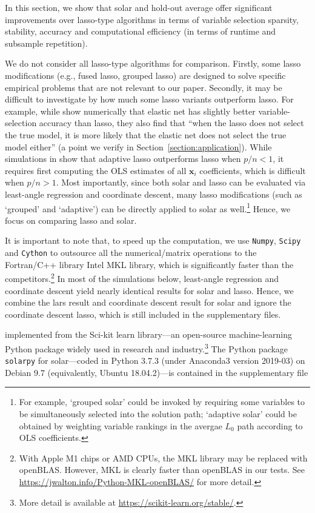 \documentclass[12pt]{article}
\begin{document}
In this section, we show that solar and hold-out average offer significant improvements over lasso-type algorithms in terms of variable selection sparsity, stability, accuracy and computational efficiency (in terms of runtime and subsample repetition).

We do not consider all lasso-type algorithms for comparison. Firstly, some lasso modifications (e.g., fused lasso, grouped lasso) are designed to solve specific empirical problems that are not relevant to our paper. Secondly, it may be difficult to investigate by how much some lasso variants outperform lasso. For example, while \citet{jia2010model} show numerically that elastic net has slightly better variable-selection accuracy than lasso, they also find that ``when the lasso does not select the true model, it is more likely that the elastic net does not select the true model either'' (a point we verify in Section~\ref{section:application}). While simulations in \citet{zou2006adaptive} show that adaptive lasso outperforms lasso when $p/n<1$, it requires first computing the OLS estimates of all $\mathbf{x}_i$ coefficients, which is difficult when $p/n>1$. Most importantly, since both solar and lasso can be evaluated via least-angle regression and coordinate descent, many lasso modifications (such as `grouped' and `adaptive') can be directly applied to solar as well.\footnote{For example, `grouped solar' could be invoked by requiring some variables to be simultaneously selected into the solution path; `adaptive solar' could be obtained by weighting variable rankings in the avergae $L_0$ path according to OLS coefficients.} Hence, we focus on comparing lasso and solar.

It is important to note that, to speed up the computation, we use \texttt{Numpy}, \texttt{Scipy} and \texttt{Cython} to outsource all the numerical/matrix operations to the Fortran/C++ library Intel MKL library, which is significantly faster than the competitors.\footnote{With Apple M1 chips or AMD CPUs, the MKL library may be replaced with openBLAS. However, MKL is clearly faster than openBLAS in our tests. See \url{https://jwalton.info/Python-MKL-openBLAS/} for more detail.} In most of the simulations below, least-angle regression and coordinate descent yield nearly identical results for solar and lasso. Hence, we combine the lars result and coordinate descent result for solar and ignore the coordinate descent lasso, which is still included in the supplementary files.

implemented from the {\sf Sci-kit learn} library---an open-source machine-learning Python package widely used in research and industry.\footnote{More detail is available at \url{https://scikit-learn.org/stable/}.} The Python package \texttt{solarpy} for solar---coded in Python 3.7.3 (under Anaconda3 version 2019-03) on Debian 9.7 (equivalently, Ubuntu 18.04.2)---is contained in the supplementary file
\end{document}
